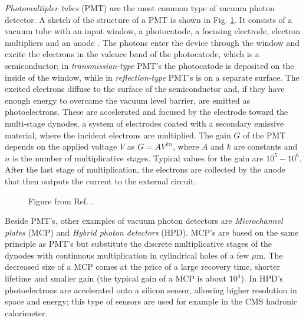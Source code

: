\textit{Photomultipler tubes} (PMT) are the most common type of vacuum photon detector. A sketch of the structure of a PMT is shown in Fig. \ref{fig:det:pmt}. It consists of a vacuum tube with an input window, a photocatode, a focusing electrode, electron multipliers and an anode  \cite{hamamatsu}. The photons enter the device through the window and excite the electrons in the valence band of the photocatode, which is a semiconductor; in \textit{transmission-type} PMT's the photocatode is deposited on the inside of the window, while in \textit{reflection-type} PMT's is on a separate surface. The excited electrons diffuse to the surface of the semiconductor and, if they have enough energy to overcame the vacuum level barrier, are emitted as photoelectrons. These are accelerated and focused by the electrode toward the multi-stage dynodes, a system of electrodes coated with a secondary emissive material, where the incident electrons are multiplied. The gain $G$ of the PMT depends on the applied voltage $V$ as $G=AV^{kn}$, where $A$ and $k$ are constants and $n$ is the number of multiplicative stages. Typical values for the gain are $10^5-10^6$. After the last stage of multiplication, the electrons are collected by the anode that then outputs the current to the external circuit.

\begin{figure}[ht]
\centering
{}
\caption{Figure from Ref. \cite{hamamatsu}.}
\label{fig:det:pmt}
\end{figure}

Beside PMT's, other examples of vacuum photon detectors are \textit{Microchannel plates} (MCP) and \textit{Hybrid photon detectors} (HPD). MCP's are based on the same principle as PMT's but substitute the discrete multiplicative stages of the dynodes with continuous multiplication in cylindrical holes of a few $\mu$m. The decreased size of a MCP comes at the price of a large recovery time, shorter lifetime and smaller gain (the typical gain of a MCP is about $10^4$). In HPD's photoelectrons are accelerated onto a silicon sensor, allowing higher resolution in space and energy; this type of sensors are used for example in the CMS hadronic calorimeter.


